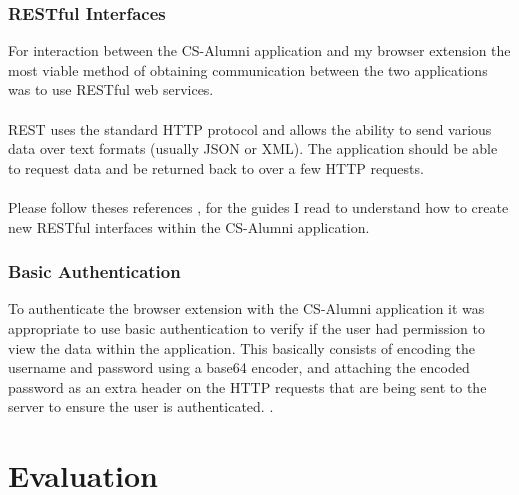 \documentclass{article}
\begin{document}
\subsubsection{RESTful Interfaces}
\label{sec:technology}

For interaction between the CS-Alumni application and my browser extension the most viable method of obtaining communication between the two applications was to use RESTful web services.\\
\\
REST uses the standard HTTP protocol and allows the ability to send various data over text formats (usually JSON or XML). The application should be able to request data and be returned back to over a few HTTP requests. \\
\\
Please follow theses references \cite[see reference][page \pageref{LastPage}]{bara:2013:online}, \cite[see reference][page \pageref{LastPage}]{saa:2013:online} for the guides I read to understand how to create new RESTful interfaces within the CS-Alumni application.

\subsubsection{Basic Authentication}


To authenticate the browser extension with the CS-Alumni application it was appropriate to use basic authentication to verify if the user had permission to view the data within the application. This basically consists of encoding the username and password using a base64 encoder, and attaching the encoded password as an extra header on the HTTP requests that are being sent to the server to ensure the user is authenticated. \cite[see reference][page \pageref{LastPage}]{wp:2014:online}.

\newpage
\section{Evaluation}
\end{document}
